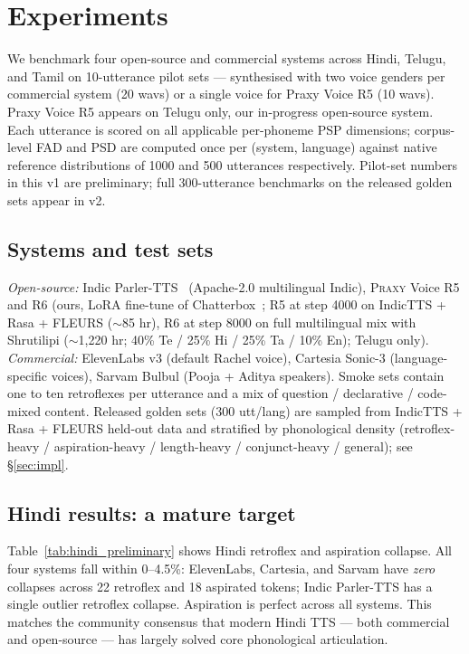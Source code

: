 \documentclass[conference,a4paper]{IEEEtran}
\newcommand{\praxy}{\textsc{Praxy}}
\begin{document}
\section{Experiments}
\label{sec:results}

We benchmark four open-source and commercial systems across Hindi, Telugu, and Tamil on 10-utterance pilot sets --- synthesised with two voice genders per commercial system (20 wavs) or a single voice for Praxy Voice R5 (10 wavs). Praxy Voice R5 appears on Telugu only, our in-progress open-source system. Each utterance is scored on all applicable per-phoneme PSP dimensions; corpus-level FAD and PSD are computed once per (system, language) against native reference distributions of 1000 and 500 utterances respectively. Pilot-set numbers in this v1 are preliminary; full 300-utterance benchmarks on the released golden sets appear in v2.

\subsection{Systems and test sets}
\emph{Open-source:} Indic Parler-TTS~\cite{parler2024} (Apache-2.0 multilingual Indic), \praxy{} Voice R5 and R6 (ours, LoRA fine-tune of Chatterbox~\cite{chatterbox2025}; R5 at step 4000 on IndicTTS + Rasa + FLEURS ($\sim$85 hr), R6 at step 8000 on full multilingual mix with Shrutilipi ($\sim$1{,}220 hr; 40\% Te / 25\% Hi / 25\% Ta / 10\% En); Telugu only).
\emph{Commercial:} ElevenLabs v3 (default Rachel voice), Cartesia Sonic-3 (language-specific voices), Sarvam Bulbul (Pooja + Aditya speakers).
Smoke sets contain one to ten retroflexes per utterance and a mix of question / declarative / code-mixed content. Released golden sets (300 utt/lang) are sampled from IndicTTS + Rasa + FLEURS held-out data and stratified by phonological density (retroflex-heavy / aspiration-heavy / length-heavy / conjunct-heavy / general); see §\ref{sec:impl}.

\subsection{Hindi results: a mature target}

Table~\ref{tab:hindi_preliminary} shows Hindi retroflex and aspiration collapse. All four systems fall within 0--4.5\%: ElevenLabs, Cartesia, and Sarvam have \emph{zero} collapses across 22 retroflex and 18 aspirated tokens; Indic Parler-TTS has a single outlier retroflex collapse. Aspiration is perfect across all systems. This matches the community consensus that modern Hindi TTS --- both commercial and open-source --- has largely solved core phonological articulation.
\end{document}
